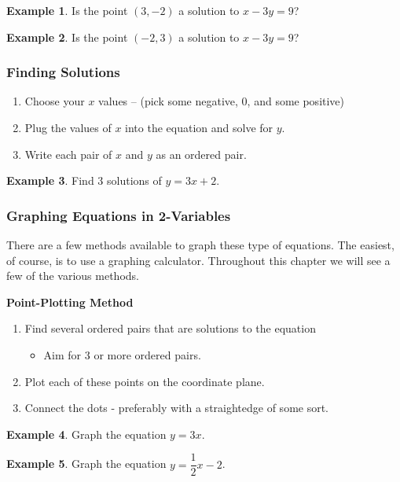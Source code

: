 \documentclass[addpoints,12pt]{exam}
\theoremstyle{definition}
\theoremstyle{break}
\theoremstyle{break}
\newtheorem{example}{Example}[subsection]
\begin{document}
\begin{example}
Is the point $(3,-2)$ a solution to $x-3y=9$?
\vspace{1in}
\end{example}

\begin{example}
Is the point $(-2,3)$ a solution to $x-3y=9$?
\vspace{1in}
\end{example}

\subsubsection*{Finding Solutions}
\begin{enumerate}
\item Choose your $x$ values -- (pick some negative, 0, and some positive)
\item Plug the values of $x$ into the equation and solve for $y$.
\item Write each pair of $x$ and $y$ as an ordered pair.
\end{enumerate}

\vspace{.15in}
\begin{example}
Find 3 solutions of $y=3x+2$.
\end{example}

\newpage

\subsubsection*{Graphing Equations in 2-Variables}
\noindent There are a few methods available to graph these type of equations. The easiest, of course, is to use a graphing calculator. Throughout this chapter we will see a few of the various methods.

\begin{mdframed}
\textbf{Point-Plotting Method}
\begin{enumerate}
\item Find several ordered pairs that are solutions to the equation
\begin{itemize}
\item Aim for 3 or more ordered pairs.
\end{itemize}
\item Plot each of these points on the coordinate plane.
\item Connect the dots - preferably with a straightedge of some sort.
\end{enumerate}
\end{mdframed}

\vspace{.15in}

\begin{example}
Graph the equation $y=3x$.
\vspace{3.5in}
\end{example}

\newpage

\begin{example}
Graph the equation $y=\dfrac{1}{2}x-2$.
\end{example}
\end{document}
